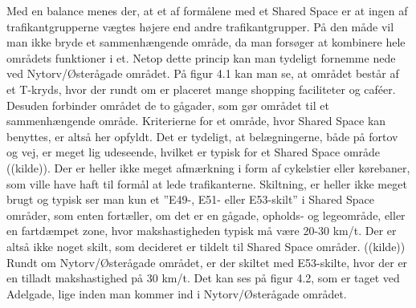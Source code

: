 Med en balance menes der, at et af formålene med et Shared Space er at ingen af trafikantgrupperne vægtes højere end andre trafikantgrupper. På den måde vil man ikke bryde et sammenhængende område, da man forsøger at kombinere hele områdets funktioner i et. Netop dette princip kan man tydeligt fornemme nede ved Nytorv/Østerågade området. På figur 4.1 kan man se, at området består af et T-kryds, hvor der rundt om er placeret mange shopping faciliteter og caféer. Desuden forbinder området de to gågader, som gør området til et sammenhængende område. Kriterierne for et område, hvor Shared Space kan benyttes, er altså her opfyldt. 
Det er tydeligt, at belægningerne, både på fortov og vej, er meget lig udeseende, hvilket er typisk for et Shared Space område ((kilde)). Der er heller ikke meget afmærkning i form af cykelstier eller kørebaner, som ville have haft til formål at lede trafikanterne. Skiltning, er heller ikke meget brugt og typisk ser man kun et ”E49-, E51- eller E53-skilt” i Shared Space områder, som enten fortæller, om det er en gågade, opholds- og legeområde, eller en fartdæmpet zone, hvor makshastigheden typisk må være 20-30 km/t. Der er altså ikke noget skilt, som decideret er tildelt til Shared Space områder. ((kilde)) Rundt om Nytorv/Østerågade området, er der skiltet med E53-skilte, hvor der er en tilladt makshastighed på 30 km/t. Det kan ses på figur 4.2, som er taget ved Adelgade, lige inden man kommer ind i Nytorv/Østerågade området.

